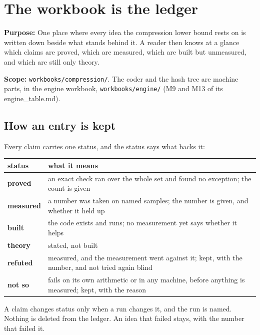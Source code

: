 \chapter{\texorpdfstring{The workbook is the ledger}{The workbook is the ledger}}
\label{chap:readme}

\textbf{Purpose:} One place where every idea the compression lower bound rests on is written down beside what stands behind it. A reader then knows at a glance which claims are proved, which are measured, which are built but unmeasured, and which are still only theory.

\textbf{Scope:} \texttt{workbooks/\allowbreak{}compression/\allowbreak{}}. The coder and the hash tree are machine parts, in the engine workbook, \texttt{workbooks/\allowbreak{}engine/\allowbreak{}} (M9 and M13 of its engine\_\allowbreak{}table.md).

\section{\texorpdfstring{How an entry is kept}{How an entry is kept}}

Every claim carries one status, and the status says what backs it:

{\small
\setlength{\tabcolsep}{6pt}
\begin{longtable}{>{\RaggedRight\arraybackslash}p{}>{\RaggedRight\arraybackslash}p{}}
\toprule
status & what it means \\
\midrule
\endhead
\textbf{proved} & an exact check ran over the whole set and found no exception; the count is given \\
\textbf{measured} & a number was taken on named samples; the number is given, and whether it held up \\
\textbf{built} & the code exists and runs; no measurement yet says whether it helps \\
\textbf{theory} & stated, not built \\
\textbf{refuted} & measured, and the measurement went against it; kept, with the number, and not tried again blind \\
\textbf{not so} & fails on its own arithmetic or in any machine, before anything is measured; kept, with the reason \\
\bottomrule
\end{longtable}
}

A claim changes status only when a run changes it, and the run is named. Nothing is deleted from the ledger. An idea that failed stays, with the number that failed it.

